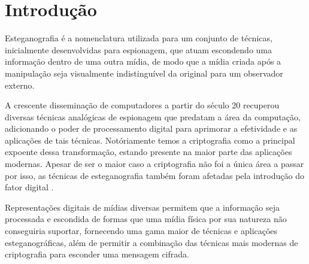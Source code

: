 
\section{Introdução}
\label{sec.intro}

Esteganografia é a nomenclatura utilizada para um conjunto de técnicas, inicialmente desenvolvidas para espionagem, que atuam escondendo uma informação dentro de uma outra mídia, de modo que a mídia criada após a manipulação seja visualmente indistinguível da original para um observador externo.

A crescente disseminação de computadores a partir do século 20 recuperou diversas técnicas analógicas de espionagem que predatam a área da computação, adicionando o poder de processamento digital para aprimorar a efetividade e as aplicações de tais técnicas. Notóriamente temos a criptografia como a principal expoente dessa transformação, estando presente na maior parte das aplicações modernas. Apesar de ser o maior caso a criptografia não foi a única área a passar por isso, as técnicas de esteganografia também foram afetadas pela introdução do fator digital \cite{JohnsonJajodia}.




Representações digitais de mídias diversas permitem que a informação seja processada e escondida de formas que uma mídia física por sua natureza não conseguiria suportar, fornecendo uma gama maior de técnicas e aplicações esteganográficas, além de permitir a combinação das técnicas mais modernas de criptografia para esconder uma mensagem cifrada.

